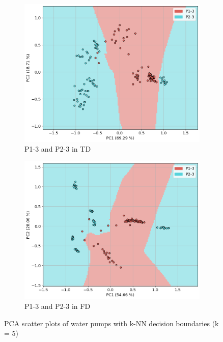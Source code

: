 \documentclass{llncs}
\begin{document}
\begin{figure}
\begin{subfigure}[b]{0.45\textwidth}
         \centering
         \includegraphics[width=\textwidth]{fig/scatter-pumps/binary-td.png}
         \caption{P1-3 and P2-3 in TD}
     \end{subfigure}
     \hfill
     \begin{subfigure}[b]{0.45\textwidth}
         \centering
         \includegraphics[width=\textwidth]{fig/scatter-pumps/binary-fd.png}
         \caption{P1-3 and P2-3 in FD}
     \end{subfigure}
     \caption{PCA scatter plots of water pumps with k-NN decision boundaries (k = 5)}
\end{figure}
\end{document}
